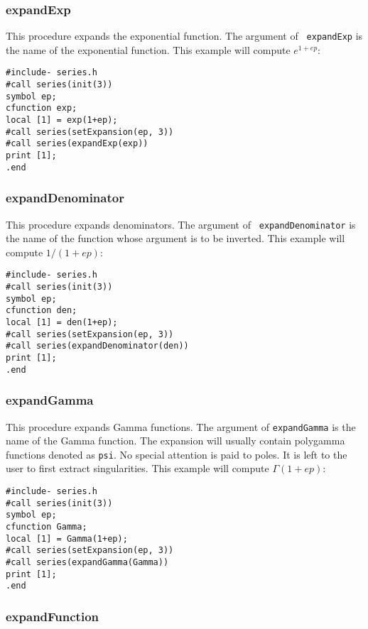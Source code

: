 \documentclass[titlepage]{article}
\begin{document}
\subsubsection{expandExp}
\label{sec:exp_fun}

This procedure expands the exponential function. The argument of {\tt
expandExp} is the name of the exponential function. This example will
compute $e^{1+ep}$:
\begin{lstlisting}
#include- series.h
#call series(init(3))
symbol ep;
cfunction exp;
local [1] = exp(1+ep);
#call series(setExpansion(ep, 3))
#call series(expandExp(exp))
print [1];
.end
\end{lstlisting}

\subsubsection{expandDenominator}
\label{sec:inv_fun}

This procedure expands denominators. The argument of {\tt
expandDenominator} is the name of the function whose argument is to be
inverted. This example will compute $1/(1+ep)$:
\begin{lstlisting}
#include- series.h
#call series(init(3))
symbol ep;
cfunction den;
local [1] = den(1+ep);
#call series(setExpansion(ep, 3))
#call series(expandDenominator(den))
print [1];
.end
\end{lstlisting}

\subsubsection{expandGamma}
\label{sec:exp_Gamma}

This procedure expands Gamma functions. The argument of {\tt expandGamma} is
the name of the Gamma function. The expansion will usually contain polygamma
functions denoted as {\tt psi}. No special attention is paid to
poles. It is left to the user to first extract singularities.
This example will compute $\Gamma(1+ep)$:
\begin{lstlisting}
#include- series.h
#call series(init(3))
symbol ep;
cfunction Gamma;
local [1] = Gamma(1+ep);
#call series(setExpansion(ep, 3))
#call series(expandGamma(Gamma))
print [1];
.end
\end{lstlisting}

\subsubsection{expandFunction}
\label{sec:inv_fun}
\end{document}
